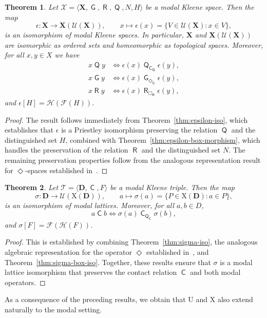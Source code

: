 \documentclass{article}
\newtheorem{theorem}{Theorem}[section]
\DeclareMathOperator{\con}{\mathsf{C}}
\DeclareMathOperator{\Q}{\mathsf{Q}}
\DeclareMathOperator{\G}{\mathsf{G}}
\DeclareMathOperator{\R}{\mathsf{R}}
\newcommand{\D}{\mathbf{D}}
\newcommand{\X}{\mathbf{X}}
\newcommand{\T}{\mathcal{T}}
\newcommand{\U}{\mathcal{U}}
\begin{document}
\begin{theorem}
\label{thm:epsilon-mdkt-morphism}
Let $\mathcal{X} = \langle \X, \G, \R, \Q,N, H \rangle$ be a modal Kleene space. Then the map
\[
\epsilon \colon \X \longrightarrow \X(\U(\X)), \qquad x \mapsto \epsilon(x) = \{V \in \U(\X) : x \in V\},
\]
is an isomorphism of modal Kleene spaces. In particular, $\X$ and $\X(\U(\X))$ are isomorphic as ordered sets and homeomorphic as topological spaces. Moreover, for all $x, y \in X$ we have
\begin{align*}
x \Q y &\iff \epsilon(x)\Q_{\con_{\Q}} \epsilon(y),\\
x\G y &\iff  \epsilon(x)\G_{\Diamond_{\G}} \epsilon(y),\\
x\R y &\iff \epsilon(x)\R_{\Box_{\R}} \epsilon(y),
\end{align*}
and $\epsilon[H] = \mathcal{H}(\mathcal{F}(H))$.
\end{theorem}
\begin{proof}
The result follows immediately from Theorem~\ref{thm:epsilon-iso}, which establishes that $\epsilon$ is a Priestley isomorphism preserving the relation $\Q$ and the distinguished set $H$, combined with Theorem~\ref{thm:epsilon-box-morphism}, which handles the preservation of the relation $\R$ and the distinguished set $N$. The remaining preservation properties follow from the analogous representation result for $\Diamond$-spaces established in~\cite{petrovich1996}.
\end{proof}

\begin{theorem}
\label{thm:sigma-mdkt-iso}
Let $\T = \langle \D, \con, F \rangle$ be a modal Kleene triple. Then the map
\[
\sigma \colon \D \longrightarrow \U(\mathrm{X}(\D)), \qquad a \mapsto \sigma(a) = \{P \in \mathrm{X}(\D) : a \in P\},
\]
is an isomorphism of modal lattices. Moreover, for all $a, b \in D$,
\[
a \con b \iff \sigma(a) \con_{\Q_{\con}} \sigma(b),
\]
and $\sigma[F] = \mathcal{F}(\mathcal{H}(F))$.
\end{theorem}
\begin{proof}
This is established by combining Theorem~\ref{thm:sigma-iso}, the analogous algebraic representation for the operator $\Diamond$ established in~\cite{petrovich1996}, and Theorem~\ref{thm:sigma-box-iso}. Together, these results ensure that $\sigma$ is a modal lattice isomorphism that preserves the contact relation $\con$ and both modal operators.
\end{proof}

As a consequence of the preceding results, we obtain that $\mathrm{U}$ and $\mathrm{X}$ also extend naturally to the modal setting.
\end{document}
